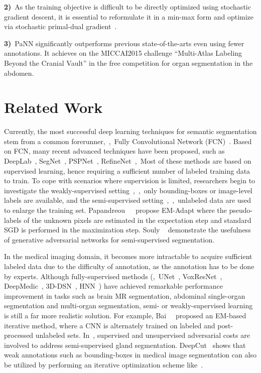 \documentclass[10pt,twocolumn,letterpaper]{article}
\begin{document}
\noindent\textbf{2)}~As the training objective is difficult to be directly optimized using stochastic gradient descent, it is essential to reformulate it in a min-max form and optimize via stochastic primal-dual gradient~\cite{liu2017unsupervised}.

\noindent\textbf{3)}~PaNN significantly outperforms previous state-of-the-arts even using fewer annotations. It achieves  on the MICCAI2015 challenge ``Multi-Atlas Labeling Beyond the Cranial Vault'' in the free competition for organ segmentation in the abdomen.



\section{Related Work} \label{sec:related}
Currently, the most successful deep learning techniques for semantic segmentation stem from a common forerunner,~\ie,~Fully Convolutional Network (FCN)~\cite{long2014fully}. Based on FCN, many recent advanced techniques have been proposed, such as DeepLab~\cite{chen2015semantic, chen2018deeplab, chen2018encoder}, SegNet~\cite{badrinarayanan2017segnet}, PSPNet~\cite{zhao2017pyramid}, RefineNet~\cite{lin2017refinenet},~\etc Most of these methods are based on supervised learning, hence requiring a sufficient number of labeled training data to train. 
To cope with scenarios where supervision is limited, researchers begin to investigate the weakly-supervised setting~\cite{papandreou2015weakly,pathak2014fully,dai2015boxsup},~\eg,~only bounding-boxes or image-level labels are available, and the semi-supervised setting~\cite{papandreou2015weakly, souly2017semi},~\ie,~unlabeled data are used to enlarge the training set. Papandreou~\etal~\cite{papandreou2015weakly}~propose EM-Adapt where the pseudo-labels of the unknown pixels are estimated in the expectation step and standard SGD is performed in the maximization step. Souly \etal~\cite{souly2017semi} demonstrate the usefulness of generative adversarial networks for semi-supervised segmentation.

In the medical imaging domain, it becomes more intractable to acquire sufficient labeled data due to the difficulty of annotation, as the annotation has to be done by experts. Although fully-supervised methods (\eg,~UNet~\cite{ronneberger2015u}, VoxResNet~\cite{chen2017voxresnet}, DeepMedic~\cite{kamnitsas2017efficient}, 3D-DSN~\cite{dou20163d}, HNN~\cite{roth2018spatial}) have achieved remarkable performance improvement in tasks such as brain MR segmentation, abdominal single-organ segmentation and multi-organ segmentation, semi- or weakly-supervised learning is still a far more realistic solution. For example, Bai~\etal~\cite{bai2017semi} proposed an EM-based iterative method, where a CNN is alternately trained on labeled and post-processed unlabeled sets. In~\cite{zhang2017deep}, supervised and unsupervised adversarial costs are involved to address semi-supervised gland segmentation. DeepCut~\cite{rajchl2017deepcut} shows that weak annotations such as bounding-boxes in medical image segmentation can also be utilized by performing an iterative optimization scheme like~\cite{papandreou2015weakly}.
\end{document}
